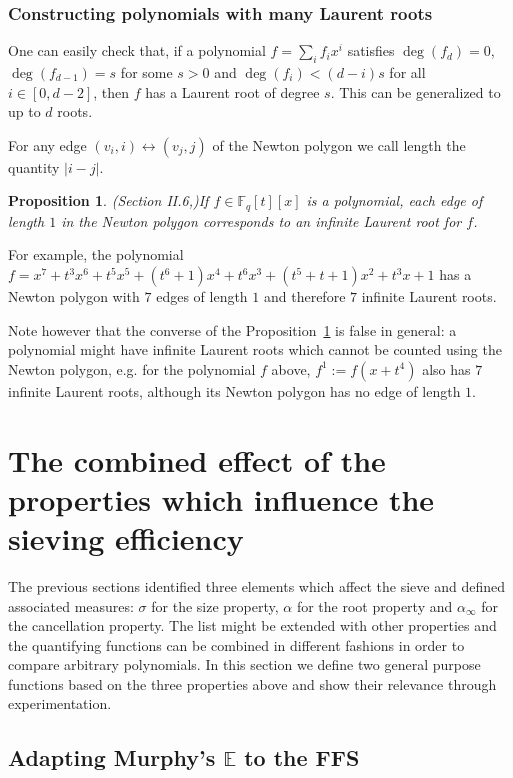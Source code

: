 \documentclass[a4wide]{article}
\newcommand{\F}{{\mathbb F}}
\theoremstyle{plain}
\newtheorem{prop}[theo]{Proposition}
\theoremstyle{definition}
\theoremstyle{remark}
\begin{document}
\subsubsection{Constructing polynomials with many Laurent roots}\label{many}
One can easily check that, if a polynomial $f=\sum_i f_ix^i$ satisfies $\deg(f_d)=0$, $\deg(f_{d-1})=s$ for
some $s>0$ and $\deg(f_i)< (d-i)s$ for all
$i\in[0,d-2]$, then $f$ has a Laurent root of degree $s$. This can be
generalized to up to $d$ roots.

  For any edge
 $(v_i,i)\leftrightarrow(v_j,j)$ of the Newton polygon we call length the
 quantity $|i-j|$.   
 \begin{prop}(Section II.6,\cite{Neu99})\label{cor_slope} If $f\in\F_q[t][x]$ is
	 a polynomial, each edge of length $1$ in the Newton polygon
	 corresponds to an infinite Laurent root for $f$. 
\end{prop}
For example, the polynomial $f=x^7+t^3x^6+t^5x^5+(t^6+1)x^4+t^6x^3+(t^5+t+1)x^2+t^3x+1$
has a Newton polygon with $7$ edges of length $1$ and therefore $7$ infinite Laurent roots.

Note however that the converse of the Proposition~\ref{cor_slope}
is false in general: a polynomial might have infinite Laurent roots which cannot be
counted using the Newton polygon, e.g. for the polynomial $f$ above,
$f^{1}:=f(x+t^4)$ also has $7$ infinite Laurent roots, although its Newton
polygon has no edge of length $1$.



\section{The combined effect of the properties which influence the sieving
efficiency}\label{sec:combining}

The previous sections identified three elements which affect the sieve and
defined associated measures: $\sigma$ for the size
property, $\alpha$ for the root property and $\alpha_\infty$ for the
cancellation property. The list might be extended with other properties and the
quantifying functions can be combined in different fashions in order to compare
arbitrary polynomials. In this section we define two general purpose
functions based on the three properties above and show their relevance through
experimentation. 

\subsection{Adapting Murphy's $\mathbb{E}$ to the FFS}
\end{document}

